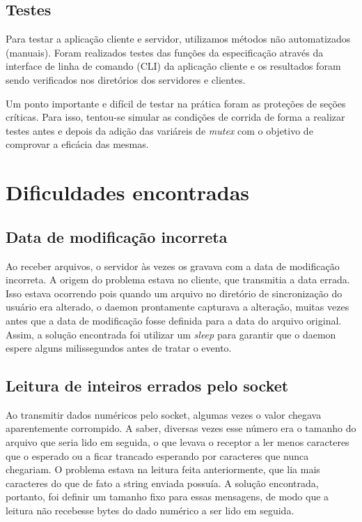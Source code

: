 \documentclass[a4paper]{article}
\begin{document}
\subsection{Testes}
Para testar a aplicação cliente e servidor, utilizamos métodos não automatizados (manuais). Foram realizados testes das funções da especificação através da interface de linha de comando (CLI) da aplicação cliente e os resultados foram sendo verificados nos diretórios dos servidores e clientes.

Um ponto importante e difícil de testar na prática foram as proteções de seções críticas. Para isso, tentou-se simular as condições de corrida de forma a realizar testes antes e depois da adição das variáreis de \textit{mutex} com o objetivo de comprovar a eficácia das mesmas.

\section{Dificuldades encontradas}

\subsection{Data de modificação incorreta}
Ao receber arquivos, o servidor às vezes os gravava com a data de modificação incorreta. A origem do problema estava no cliente, que transmitia a data errada. Isso estava ocorrendo pois quando um arquivo no diretório de sincronização do usuário era alterado, o daemon prontamente capturava a alteração, muitas vezes antes que a data de modificação fosse definida para a data do arquivo original. Assim, a solução encontrada foi utilizar um \textit{sleep} para garantir que o daemon espere alguns milissegundos antes de tratar o evento.

\subsection{Leitura de inteiros errados pelo socket}
Ao transmitir dados numéricos pelo socket, algumas vezes o valor chegava aparentemente corrompido. A saber, diversas vezes esse número era o tamanho do arquivo que seria lido em seguida, o que levava o receptor a ler menos caracteres que o esperado ou a ficar trancado esperando por caracteres que nunca chegariam. O problema estava na leitura feita anteriormente, que lia mais caracteres do que de fato a string enviada possuía. A solução encontrada, portanto, foi definir um tamanho fixo para essas mensagens, de modo que a leitura não recebesse bytes do dado numérico a ser lido em seguida.
\end{document}

